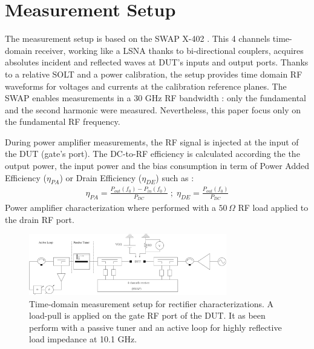 \documentclass[conference]{IEEEtran}
\begin{document}
\section{Measurement Setup}
The measurement setup is based on the SWAP X-402 \cite{Verspecht2010,Roblin2011}. This 4 channels time-domain receiver, working like a LSNA \cite{Verspecht2005} thanks to bi-directional couplers, acquires absolutes incident and reflected waves at DUT's inputs and output ports. Thanks to a relative SOLT and a power calibration, the setup provides time domain RF waveforms for voltages and currents at the calibration reference planes. The SWAP enables measurements in a $30$ GHz RF bandwidth : only the fundamental and the second harmonic were measured. Nevertheless, this paper focus only on the fundamental RF frequency.

During power amplifier measurements, the RF signal is injected at the input of the DUT (gate's port). The DC-to-RF efficiency is calculated according the the output power, the input power and the bias consumption in term of Power Added Efficiency ($\eta_{PA}$) or Drain Efficiency ($\eta_{DE}$) such as :
\begin{eqnarray}
\eta_{PA}=\frac{P_{out}\left(f_0\right)-P_{in}\left(f_0\right)}{P_{DC}} \; ; \; \eta_{DE}=\frac{P_{out}\left(f_0\right)}{P_{DC}}
\end{eqnarray}
Power amplifier characterization where performed with a $50\,\Omega$ RF load applied to the drain RF port.

\begin{figure}[ht!] %
\centering
\includegraphics[width=3.4in]{IMS2014_bench.pdf}
\caption{ Time-domain measurement setup for rectifier characterizations. A load-pull is applied on the gate RF port of the DUT. It as been perform with a passive tuner and an active loop for highly reflective load impedance at 10.1 GHz.}
\label{bench}
\end{figure}
\end{document}
